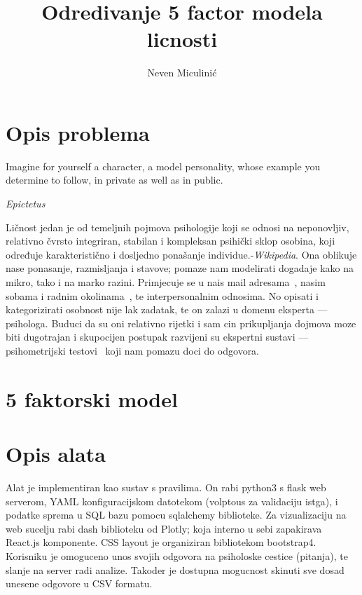 \documentclass[times, utf8, seminar]{fer}
\begin{document}
\theoremstyle{definition}
\newtheorem{definition}{Definition}[section]

\title{Odredivanje 5 factor modela licnosti}
\author{Neven Miculinić}

\maketitle
\tableofcontents

\chapter{Opis problema}

\epigraph{Imagine for yourself a character, a model personality, whose example you determine to follow, in private as well as in public.
}{\textit{Epictetus}}
Ličnost jedan je od temeljnih pojmova psihologije koji se odnosi na neponovljiv, relativno čvrsto integriran, stabilan i kompleksan psihički sklop osobina, koji određuje karakteristično i dosljedno ponašanje individue.-\textit{Wikipedia}.
Ona oblikuje nase ponasanje, razmisljanja i stavove; pomaze nam modelirati dogadaje kako na mikro, tako i na marko razini. Primjecuje se u nais mail adresama~\cite{mail-personality}, nasim sobama i radnim okolinama~\cite{gosling2002room}, te interpersonalnim odnosima.
No opisati i kategorizirati osobnost nije lak zadatak, te on zalazi u domenu eksperta --- psihologa.
Buduci da su oni relativno rijetki i sam cin prikupljanja dojmova moze biti dugotrajan i skupocijen postupak razvijeni su ekspertni sustavi --- psihometrijski testovi~\cite{cronbach1949essentials} koji nam pomazu doci do odgovora.

\chapter{5 faktorski model}

\chapter{Opis alata}
Alat je implementiran kao sustav s pravilima. On rabi python3 s flask web serverom, YAML konfiguracijskom datotekom (volptous za validaciju istga), i podatke sprema u SQL bazu pomocu sqlalchemy biblioteke. Za vizualizaciju na web sucelju rabi dash biblioteku od Plotly; koja interno u sebi zapakirava React.js komponente. CSS layout je organiziran bibliotekom bootstrap4. Korisniku je omoguceno unos svojih odgovora na psiholoske cestice (pitanja), te slanje na server radi analize. Takoder je dostupna mogucnost skinuti sve dosad unesene odgovore u CSV formatu.
\end{document}
